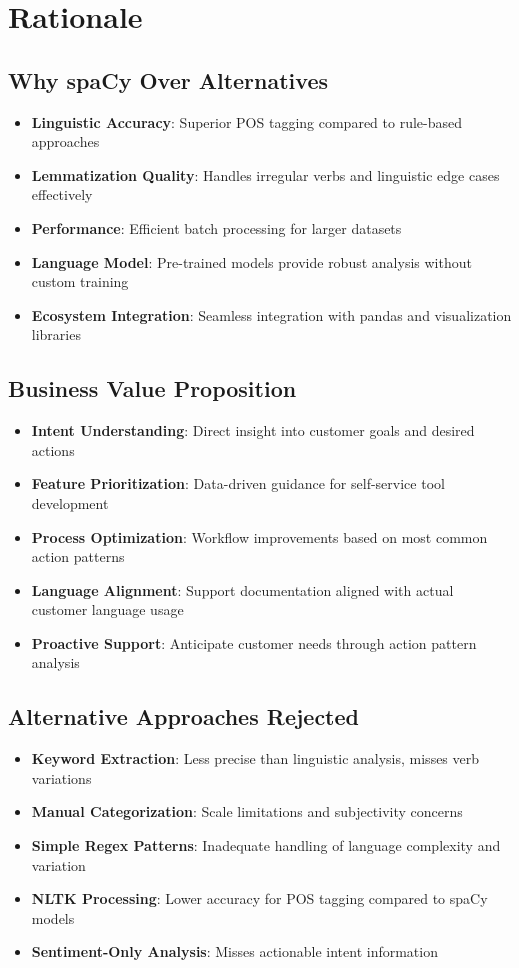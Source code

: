 \documentclass[11pt]{article}
\begin{document}
\section{Rationale}

\subsection{Why spaCy Over Alternatives}
\begin{itemize}
\item \textbf{Linguistic Accuracy}: Superior POS tagging compared to rule-based approaches
\item \textbf{Lemmatization Quality}: Handles irregular verbs and linguistic edge cases effectively
\item \textbf{Performance}: Efficient batch processing for larger datasets
\item \textbf{Language Model}: Pre-trained models provide robust analysis without custom training
\item \textbf{Ecosystem Integration}: Seamless integration with pandas and visualization libraries
\end{itemize}

\subsection{Business Value Proposition}
\begin{itemize}
\item \textbf{Intent Understanding}: Direct insight into customer goals and desired actions
\item \textbf{Feature Prioritization}: Data-driven guidance for self-service tool development
\item \textbf{Process Optimization}: Workflow improvements based on most common action patterns
\item \textbf{Language Alignment}: Support documentation aligned with actual customer language usage
\item \textbf{Proactive Support}: Anticipate customer needs through action pattern analysis
\end{itemize}

\subsection{Alternative Approaches Rejected}
\begin{itemize}
\item \textbf{Keyword Extraction}: Less precise than linguistic analysis, misses verb variations
\item \textbf{Manual Categorization}: Scale limitations and subjectivity concerns
\item \textbf{Simple Regex Patterns}: Inadequate handling of language complexity and variation
\item \textbf{NLTK Processing}: Lower accuracy for POS tagging compared to spaCy models
\item \textbf{Sentiment-Only Analysis}: Misses actionable intent information
\end{itemize}
\end{document}
